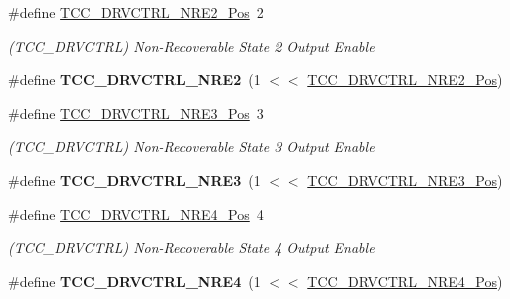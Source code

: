 \begin{DoxyCompactItemize}
\item 
\hypertarget{group___s_a_m_l21___t_c_c_ga1cea6d21d84eaf510113d266a309efc0}{}\#define \hyperlink{group___s_a_m_l21___t_c_c_ga1cea6d21d84eaf510113d266a309efc0}{T\+C\+C\+\_\+\+D\+R\+V\+C\+T\+R\+L\+\_\+\+N\+R\+E2\+\_\+\+Pos}~2\label{group___s_a_m_l21___t_c_c_ga1cea6d21d84eaf510113d266a309efc0}

\begin{DoxyCompactList}\small\item\em (T\+C\+C\+\_\+\+D\+R\+V\+C\+T\+R\+L) Non-\/\+Recoverable State 2 Output Enable \end{DoxyCompactList}\item 
\hypertarget{group___s_a_m_l21___t_c_c_gaeb5d08c254c84affe73392fa7a4bb802}{}\#define {\bfseries T\+C\+C\+\_\+\+D\+R\+V\+C\+T\+R\+L\+\_\+\+N\+R\+E2}~(1 $<$$<$ \hyperlink{group___s_a_m_l21___t_c_c_ga1cea6d21d84eaf510113d266a309efc0}{T\+C\+C\+\_\+\+D\+R\+V\+C\+T\+R\+L\+\_\+\+N\+R\+E2\+\_\+\+Pos})\label{group___s_a_m_l21___t_c_c_gaeb5d08c254c84affe73392fa7a4bb802}

\item 
\hypertarget{group___s_a_m_l21___t_c_c_ga7327ad86452bb591c689f4653f4ceebc}{}\#define \hyperlink{group___s_a_m_l21___t_c_c_ga7327ad86452bb591c689f4653f4ceebc}{T\+C\+C\+\_\+\+D\+R\+V\+C\+T\+R\+L\+\_\+\+N\+R\+E3\+\_\+\+Pos}~3\label{group___s_a_m_l21___t_c_c_ga7327ad86452bb591c689f4653f4ceebc}

\begin{DoxyCompactList}\small\item\em (T\+C\+C\+\_\+\+D\+R\+V\+C\+T\+R\+L) Non-\/\+Recoverable State 3 Output Enable \end{DoxyCompactList}\item 
\hypertarget{group___s_a_m_l21___t_c_c_gac889faed39500ec7327939cd7c792e40}{}\#define {\bfseries T\+C\+C\+\_\+\+D\+R\+V\+C\+T\+R\+L\+\_\+\+N\+R\+E3}~(1 $<$$<$ \hyperlink{group___s_a_m_l21___t_c_c_ga7327ad86452bb591c689f4653f4ceebc}{T\+C\+C\+\_\+\+D\+R\+V\+C\+T\+R\+L\+\_\+\+N\+R\+E3\+\_\+\+Pos})\label{group___s_a_m_l21___t_c_c_gac889faed39500ec7327939cd7c792e40}

\item 
\hypertarget{group___s_a_m_l21___t_c_c_ga84743c4721adfb05c7911e93f98ac0df}{}\#define \hyperlink{group___s_a_m_l21___t_c_c_ga84743c4721adfb05c7911e93f98ac0df}{T\+C\+C\+\_\+\+D\+R\+V\+C\+T\+R\+L\+\_\+\+N\+R\+E4\+\_\+\+Pos}~4\label{group___s_a_m_l21___t_c_c_ga84743c4721adfb05c7911e93f98ac0df}

\begin{DoxyCompactList}\small\item\em (T\+C\+C\+\_\+\+D\+R\+V\+C\+T\+R\+L) Non-\/\+Recoverable State 4 Output Enable \end{DoxyCompactList}\item 
\hypertarget{group___s_a_m_l21___t_c_c_ga687896bd7bc430b72587350ffe7a1df4}{}\#define {\bfseries T\+C\+C\+\_\+\+D\+R\+V\+C\+T\+R\+L\+\_\+\+N\+R\+E4}~(1 $<$$<$ \hyperlink{group___s_a_m_l21___t_c_c_ga84743c4721adfb05c7911e93f98ac0df}{T\+C\+C\+\_\+\+D\+R\+V\+C\+T\+R\+L\+\_\+\+N\+R\+E4\+\_\+\+Pos})\label{group___s_a_m_l21___t_c_c_ga687896bd7bc430b72587350ffe7a1df4}


\end{DoxyCompactItemize}
